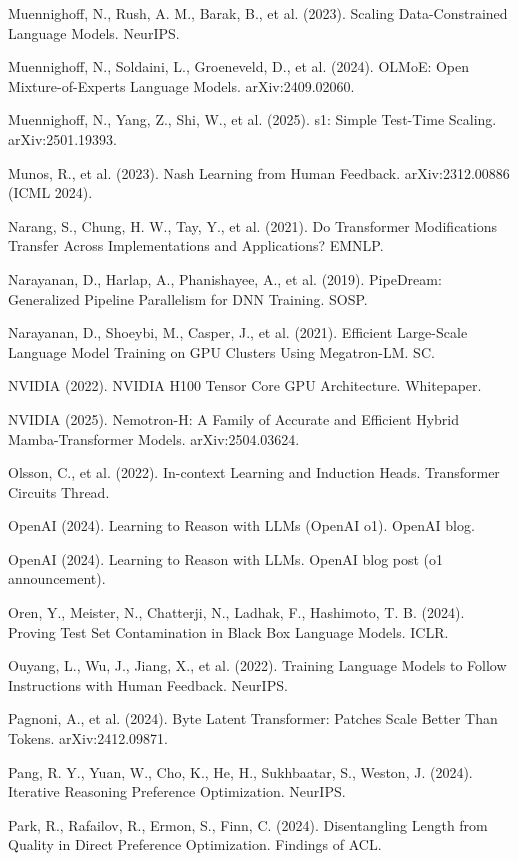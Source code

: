{\begin{enumerate}[leftmargin=*,itemsep=1pt,label={[\arabic*]}]
\item Muennighoff, N., Rush, A. M., Barak, B., et al. (2023). Scaling Data-Constrained Language Models. NeurIPS.
\item Muennighoff, N., Soldaini, L., Groeneveld, D., et al. (2024). OLMoE: Open Mixture-of-Experts Language Models. arXiv:2409.02060.
\item Muennighoff, N., Yang, Z., Shi, W., et al. (2025). s1: Simple Test-Time Scaling. arXiv:2501.19393.
\item Munos, R., et al. (2023). Nash Learning from Human Feedback. arXiv:2312.00886 (ICML 2024).
\item Narang, S., Chung, H. W., Tay, Y., et al. (2021). Do Transformer Modifications Transfer Across Implementations and Applications? EMNLP.
\item Narayanan, D., Harlap, A., Phanishayee, A., et al. (2019). PipeDream: Generalized Pipeline Parallelism for DNN Training. SOSP.
\item Narayanan, D., Shoeybi, M., Casper, J., et al. (2021). Efficient Large-Scale Language Model Training on GPU Clusters Using Megatron-LM. SC.
\item NVIDIA (2022). NVIDIA H100 Tensor Core GPU Architecture. Whitepaper.
\item NVIDIA (2025). Nemotron-H: A Family of Accurate and Efficient Hybrid Mamba-Transformer Models. arXiv:2504.03624.
\item Olsson, C., et al. (2022). In-context Learning and Induction Heads. Transformer Circuits Thread.
\item OpenAI (2024). Learning to Reason with LLMs (OpenAI o1). OpenAI blog.
\item OpenAI (2024). Learning to Reason with LLMs. OpenAI blog post (o1 announcement).
\item Oren, Y., Meister, N., Chatterji, N., Ladhak, F., Hashimoto, T. B. (2024). Proving Test Set Contamination in Black Box Language Models. ICLR.
\item Ouyang, L., Wu, J., Jiang, X., et al. (2022). Training Language Models to Follow Instructions with Human Feedback. NeurIPS.
\item Pagnoni, A., et al. (2024). Byte Latent Transformer: Patches Scale Better Than Tokens. arXiv:2412.09871.
\item Pang, R. Y., Yuan, W., Cho, K., He, H., Sukhbaatar, S., Weston, J. (2024). Iterative Reasoning Preference Optimization. NeurIPS.
\item Park, R., Rafailov, R., Ermon, S., Finn, C. (2024). Disentangling Length from Quality in Direct Preference Optimization. Findings of ACL.

\end{enumerate}}
